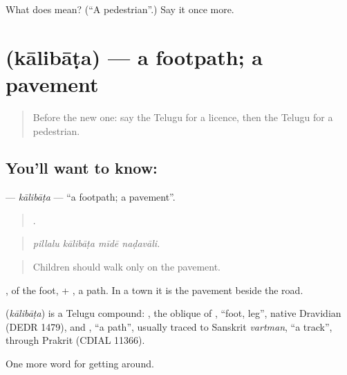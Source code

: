 \begin{tcolorbox}[breakable,colback=teal!4,colframe=teal!35!black,title={Before you move on}]
What does  mean? (\textquotedblleft{}A pedestrian\textquotedblright{}.) Say it once more.
\end{tcolorbox}
\section[\texorpdfstring{\te{కాలిబాట} (kālibāṭa)}{కాలిబాట (kālibāṭa)}]{ (kālibāṭa) — a footpath; a pavement}

\label{lesson:TE-C447-kalibata}



\begin{quote}
Before the new one: say the Telugu for a licence, then the Telugu for a pedestrian.
\end{quote}

\subsection*{You'll want to know: }
\textbf{} — \emph{kālibāṭa} — \textquotedblleft{}a footpath; a pavement\textquotedblright{}.

\begin{quote}
   .
\end{quote}

\begin{quote}
\emph{pillalu kālibāṭa mīdē naḍavāli.}
\end{quote}

\begin{quote}
Children should walk only on the pavement.
\end{quote}

, of the foot, + , a path. In a town it is the pavement beside the road.

\begin{cousinweb}
\textbf{} (\emph{kālibāṭa}) is a Telugu compound: , the oblique of , \textquotedblleft{}foot, leg\textquotedblright{}, native Dravidian (DEDR 1479), and , \textquotedblleft{}a path\textquotedblright{}, usually traced to Sanskrit \emph{vartman}, \textquotedblleft{}a track\textquotedblright{}, through Prakrit (CDIAL 11366).
\end{cousinweb}

\begin{grammarlens}[title={What you've built}]
One more word for getting around.
\end{grammarlens}

